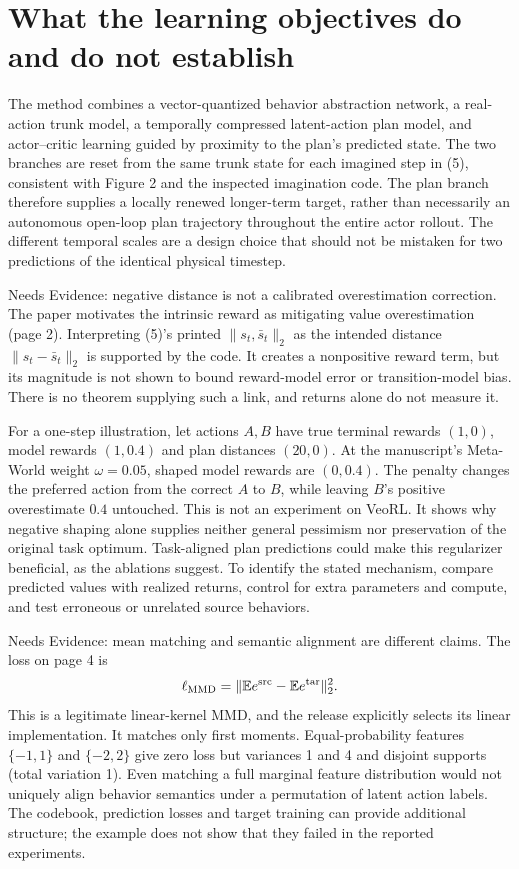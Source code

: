 \documentclass[10pt]{article}
\begin{document}
\section*{What the learning objectives do and do not establish}
The method combines a vector-quantized behavior abstraction network, a real-action trunk model, a temporally compressed latent-action plan model, and actor–critic learning guided by proximity to the plan’s predicted state. The two branches are reset from the same trunk state for each imagined step in (5), consistent with Figure 2 and the inspected imagination code. The plan branch therefore supplies a locally renewed longer-term target, rather than necessarily an autonomous open-loop plan trajectory throughout the entire actor rollout. The different temporal scales are a design choice that should not be mistaken for two predictions of the identical physical timestep.\par
Needs Evidence: negative distance is not a calibrated overestimation correction. The paper motivates the intrinsic reward as mitigating value overestimation (page 2). Interpreting (5)’s printed \(\|s_t,\bar s_t\|_2\) as the intended distance \(\|s_t-\bar s_t\|_2\) is supported by the code. It creates a nonpositive reward term, but its magnitude is not shown to bound reward-model error or transition-model bias. There is no theorem supplying such a link, and returns alone do not measure it.\par
For a one-step illustration, let actions \(A,B\) have true terminal rewards \((1,0)\), model rewards \((1,0.4)\) and plan distances \((20,0)\). At the manuscript’s Meta-World weight \(\omega=0.05\), shaped model rewards are \((0,0.4)\). The penalty changes the preferred action from the correct \(A\) to \(B\), while leaving \(B\)’s positive overestimate \(0.4\) untouched. This is not an experiment on VeoRL. It shows why negative shaping alone supplies neither general pessimism nor preservation of the original task optimum. Task-aligned plan predictions could make this regularizer beneficial, as the ablations suggest. To identify the stated mechanism, compare predicted values with realized returns, control for extra parameters and compute, and test erroneous or unrelated source behaviors.\par
Needs Evidence: mean matching and semantic alignment are different claims. The loss on page 4 is \[\ell_{\rm MMD}=\|\mathbb E e^{\rm src}-\mathbb E e^{\rm tar}\|_2^2.\] This is a legitimate linear-kernel MMD, and the release explicitly selects its linear implementation. It matches only first moments. Equal-probability features \(\{-1,1\}\) and \(\{-2,2\}\) give zero loss but variances 1 and 4 and disjoint supports (total variation 1). Even matching a full marginal feature distribution would not uniquely align behavior semantics under a permutation of latent action labels. The codebook, prediction losses and target training can provide additional structure; the example does not show that they failed in the reported experiments.\par
\end{document}

